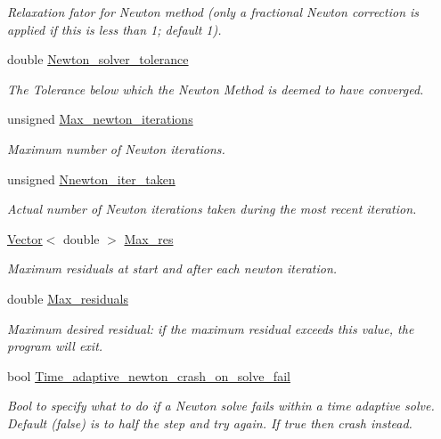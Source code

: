 \begin{DoxyCompactItemize}
\begin{DoxyCompactList}\small\item\em Relaxation fator for Newton method (only a fractional Newton correction is applied if this is less than 1; default 1). \end{DoxyCompactList}\item 
double \hyperlink{classoomph_1_1Problem_a94536b381e949edf5bb4d44434e08925}{Newton\+\_\+solver\+\_\+tolerance}
\begin{DoxyCompactList}\small\item\em The Tolerance below which the Newton Method is deemed to have converged. \end{DoxyCompactList}\item 
unsigned \hyperlink{classoomph_1_1Problem_a52a58a98c3e2e7dbaefcfb1ee7830c35}{Max\+\_\+newton\+\_\+iterations}
\begin{DoxyCompactList}\small\item\em Maximum number of Newton iterations. \end{DoxyCompactList}\item 
unsigned \hyperlink{classoomph_1_1Problem_a3c05eefd6891808a1ef01e51288e0108}{Nnewton\+\_\+iter\+\_\+taken}
\begin{DoxyCompactList}\small\item\em Actual number of Newton iterations taken during the most recent iteration. \end{DoxyCompactList}\item 
\hyperlink{classoomph_1_1Vector}{Vector}$<$ double $>$ \hyperlink{classoomph_1_1Problem_ab6f510bea9bdfcaf229415440a0a1c98}{Max\+\_\+res}
\begin{DoxyCompactList}\small\item\em Maximum residuals at start and after each newton iteration. \end{DoxyCompactList}\item 
double \hyperlink{classoomph_1_1Problem_accb8811cdf32f14be497917e922c623e}{Max\+\_\+residuals}
\begin{DoxyCompactList}\small\item\em Maximum desired residual\+: if the maximum residual exceeds this value, the program will exit. \end{DoxyCompactList}\item 
bool \hyperlink{classoomph_1_1Problem_a3e9aecf88bde320bc2d169b5f3c99fee}{Time\+\_\+adaptive\+\_\+newton\+\_\+crash\+\_\+on\+\_\+solve\+\_\+fail}
\begin{DoxyCompactList}\small\item\em Bool to specify what to do if a Newton solve fails within a time adaptive solve. Default (false) is to half the step and try again. If true then crash instead. \end{DoxyCompactList}\item 

\end{DoxyCompactItemize}
